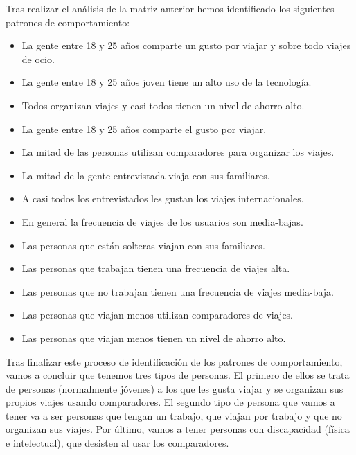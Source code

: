 Tras realizar el análisis de la matriz anterior hemos identificado los siguientes patrones de comportamiento:
\begin{itemize}
    \item La gente entre 18 y 25 años comparte un gusto por viajar y sobre todo viajes de ocio.
    \item La gente entre 18 y 25 años joven tiene un alto uso de la tecnología.
    \item Todos organizan viajes y casi todos tienen un nivel de ahorro alto. 
    \item La gente entre 18 y 25 años comparte el gusto por viajar.
    \item La mitad de las personas utilizan comparadores para organizar los viajes.
    \item La mitad de la gente entrevistada viaja con sus familiares.
    \item A casi todos los entrevistados les gustan los viajes internacionales.
    \item En general la frecuencia de viajes de los usuarios son media-bajas.
    \item Las personas que están solteras viajan con sus familiares.
    \item Las personas que trabajan tienen una frecuencia de viajes alta.
    \item Las personas que no trabajan tienen una frecuencia de viajes media-baja.
    \item Las personas que viajan menos utilizan comparadores de viajes. 
    \item Las personas que viajan menos tienen un nivel de ahorro alto.
    
\end{itemize}

Tras finalizar este proceso de identificación de los patrones de comportamiento, vamos a concluir que tenemos tres tipos de personas. El primero de ellos se trata de personas (normalmente jóvenes) a los que les gusta viajar y se organizan sus propios viajes usando comparadores. El segundo tipo de persona que vamos a tener va a ser personas que tengan un trabajo, que viajan por trabajo y que no organizan sus viajes. Por último, vamos a tener personas con discapacidad (física e intelectual), que desisten al usar los comparadores.

